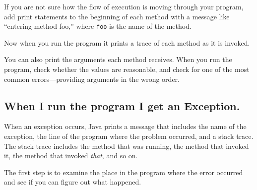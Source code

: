 \documentclass[12pt]{book}
\theoremstyle{exercise}
\begin{document}
If you are not sure how the flow of execution is moving through
your program, add print statements to the beginning of each
method with a message like ``entering method foo,'' where
{\tt foo} is the name of the method.

Now when you run the program it prints a trace of each
method as it is invoked.

You can also print the arguments each method receives.  When you run
the program, check whether the values are reasonable, and check
for one of the most common errors---providing arguments in the wrong
order.


\subsection*{When I run the program I get an Exception.}

When an exception occurs, Java prints
a message that includes the name of the
exception, the line of the program where the problem occurred, and a
stack trace.
%
The stack trace includes the method that was running,
the method that invoked it, the method that
invoked {\em that}, and so on.

The first step is to examine the place in the program where
the error occurred and see if you can figure out what happened.
\end{document}
